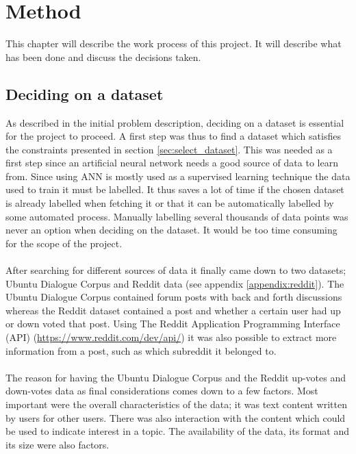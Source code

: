 \chapter{Method}\label{chap:method}
This chapter will describe the work process of this project. It will describe what has been done and discuss the decisions taken.

\section{Deciding on a dataset}\label{sec:deciding_dataset}
As described in the initial problem description, deciding on a dataset is essential for the project to proceed. A first step was thus to find a dataset which satisfies the constraints presented in section \ref{sec:select_dataset}. This was needed as a first step since an artificial neural network needs a good source of data to learn from. Since using ANN is mostly used as a supervised learning technique the data used to train it must be labelled. It thus saves a lot of time if the chosen dataset is already labelled when fetching it or that it can be automatically labelled by some automated process. Manually labelling several thousands of data points was never an option when deciding on the dataset. It would be too time consuming for the scope of the project.
\\\\
After searching for different sources of data it finally came down to two datasets; Ubuntu Dialogue Corpus \parencite{lowe2015ubuntu} and Reddit data (see appendix \ref{appendix:reddit}). The Ubuntu Dialogue Corpus contained forum posts with back and forth discussions whereas the Reddit dataset contained a post and whether a certain user had up or down voted that post. Using The Reddit Application Programming Interface (API) (\url{https://www.reddit.com/dev/api/}) it was also possible to extract more information from a post, such as which subreddit it belonged to.
\\\\
The reason for having the Ubuntu Dialogue Corpus and the Reddit up-votes and down-votes data as final considerations comes down to a few factors. Most important were the overall characteristics of the data; it was text content written by users for other users. There was also interaction with the content which could be used to indicate interest in a topic. The availability of the data, its format and its size were also factors.
\\\\

